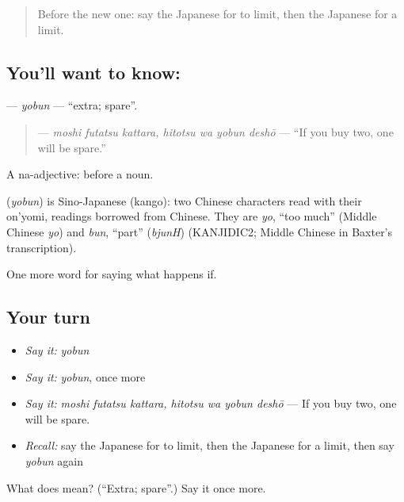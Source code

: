 \begin{quote}
Before the new one: say the Japanese for to limit, then the Japanese for a limit.
\end{quote}

\subsection*{You'll want to know: }
\textbf{} — \emph{yobun} — \textquotedblleft{}extra; spare\textquotedblright{}.

\begin{quote}
\textbf{   } — \emph{moshi futatsu kattara, hitotsu wa yobun deshō} — \textquotedblleft{}If you buy two, one will be spare.\textquotedblright{}
\end{quote}

A na-adjective:  before a noun.

\begin{cousinweb}
\textbf{} (\emph{yobun}) is Sino-Japanese (kango): two Chinese characters read with their on'yomi, readings borrowed from Chinese. They are \emph{yo}, \textquotedblleft{}too much\textquotedblright{} (Middle Chinese \emph{yo}) and \emph{bun}, \textquotedblleft{}part\textquotedblright{} (\emph{bjunH}) (KANJIDIC2; Middle Chinese in Baxter's transcription).
\end{cousinweb}

\begin{grammarlens}[title={What you've built}]
One more word for saying what happens if.
\end{grammarlens}

\subsection*{Your turn}
\begin{itemize}
\raggedright
  \item \emph{Say it:} \emph{yobun}
  \item \emph{Say it:} \emph{yobun}, once more
  \item \emph{Say it:} \emph{moshi futatsu kattara, hitotsu wa yobun deshō} — If you buy two, one will be spare.
  \item \emph{Recall:} say the Japanese for to limit, then the Japanese for a limit, then say \emph{yobun} again
\end{itemize}

\begin{tcolorbox}[breakable,colback=teal!4,colframe=teal!35!black,title={Before you move on}]
What does  mean? (\textquotedblleft{}Extra; spare\textquotedblright{}.) Say it once more.
\end{tcolorbox}

